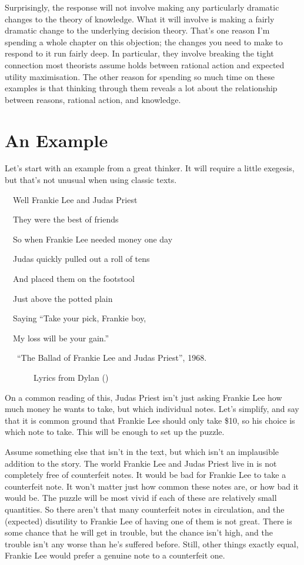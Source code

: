 \documentclass[
  12pt,
  letterpaper,
]{scrbook}
\begin{document}
Surprisingly, the response will not involve making any particularly
dramatic changes to the theory of knowledge. What it will involve is
making a fairly dramatic change to the underlying decision theory.
That's one reason I'm spending a whole chapter on this objection; the
changes you need to make to respond to it run fairly deep. In
particular, they involve breaking the tight connection most theorists
assume holds between rational action and expected utility maximisation.
The other reason for spending so much time on these examples is that
thinking through them reveals a lot about the relationship between
reasons, rational action, and knowledge.

\section{An Example}\label{sec-frankielee}

Let's start with an example from a great thinker. It will require a
little exegesis, but that's not unusual when using classic texts.

~~Well Frankie Lee and Judas Priest ~\\
\strut ~~They were the best of friends ~\\
\strut ~~So when Frankie Lee needed money one day ~\\
\strut ~~Judas quickly pulled out a roll of tens ~\\
\strut ~~And placed them on the footstool ~\\
\strut ~~Just above the potted plain ~\\
\strut ~~Saying ``Take your pick, Frankie boy, ~\\
\strut ~~My loss will be your gain.'' ~\\
\strut ~~~``The Ballad of Frankie Lee and Judas Priest'', 1968.\\
\strut ~~~~~~~Lyrics from Dylan ()

On a common reading of this, Judas Priest isn't just asking Frankie Lee
how much money he wants to take, but which individual notes. Let's
simplify, and say that it is common ground that Frankie Lee should only
take \$10, so his choice is which note to take. This will be enough to
set up the puzzle.

Assume something else that isn't in the text, but which isn't an
implausible addition to the story. The world Frankie Lee and Judas
Priest live in is not completely free of counterfeit notes. It would be
bad for Frankie Lee to take a counterfeit note. It won't matter just how
common these notes are, or how bad it would be. The puzzle will be most
vivid if each of these are relatively small quantities. So there aren't
that many counterfeit notes in circulation, and the (expected)
disutility to Frankie Lee of having one of them is not great. There is
some chance that he will get in trouble, but the chance isn't high, and
the trouble isn't any worse than he's suffered before. Still, other
things exactly equal, Frankie Lee would prefer a genuine note to a
counterfeit one.
\end{document}
